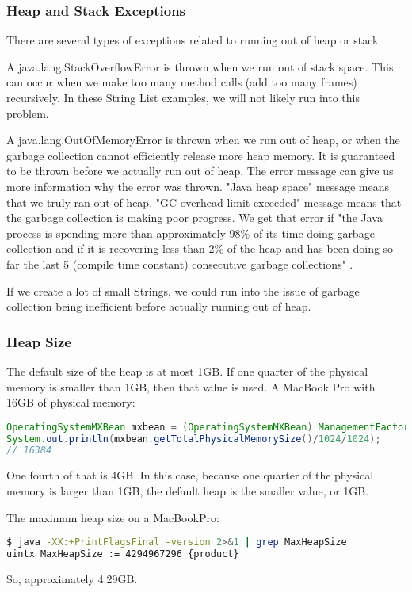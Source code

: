 \subsubsection{Heap and Stack Exceptions}
There are several types of exceptions related to running out of heap or stack.

A java.lang.StackOverflowError is thrown when we run out of stack space. This can occur when we make too many method calls (add too many frames) recursively. In these String List examples, we will not likely run into this problem.

A java.lang.OutOfMemoryError is thrown when we run out of heap, or when the garbage collection cannot efficiently release more heap memory. It is guaranteed to be thrown before we actually run out of heap. The error message can give us more information why the error was thrown. "Java heap space" message means that we truly ran out of heap. "GC overhead limit exceeded" message means that the garbage collection is making poor progress. We get that error if "the Java process is spending more than approximately 98\% of its time doing garbage collection and if it is recovering less than 2\% of the heap and has been doing so far the last 5 (compile time constant) consecutive garbage collections" \cite{gosling}.

If we create a lot of small Strings, we could run into the issue of garbage collection being inefficient before actually running out of heap.

\subsubsection{Heap Size}

The default size of the heap is at most 1GB. If one quarter of the physical memory is smaller than 1GB, then that value is used\cite{gcergo}. A MacBook Pro with 16GB of physical memory:
\begin{lstlisting}[language=Java]
OperatingSystemMXBean mxbean = (OperatingSystemMXBean) ManagementFactory.getOperatingSystemMXBean();
System.out.println(mxbean.getTotalPhysicalMemorySize()/1024/1024);
// 16384
\end{lstlisting}

One fourth of that is 4GB. In this case, because one quarter of the physical memory is larger than 1GB, the default heap is the smaller value, or 1GB.

The maximum heap size on a MacBookPro:
\begin{lstlisting}[language=bash]
$ java -XX:+PrintFlagsFinal -version 2>&1 | grep MaxHeapSize
uintx MaxHeapSize := 4294967296 {product}
\end{lstlisting}
So, approximately 4.29GB. 

